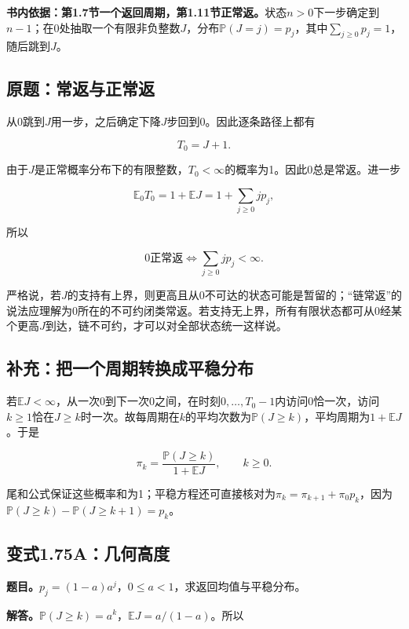 \documentclass[
  11pt,a4paper,UTF8,fontset=fandol]{ctexart}
\begin{document}
\textbf{书内依据：第1.7节一个返回周期，第1.11节正常返。}状态\(n>0\)下一步确定到\(n-1\)；在0处抽取一个有限非负整数\(J\)，分布\(\mathbb P(J=j)=p_j\)，其中\(\sum_{j\ge0}p_j=1\)，随后跳到\(J\)。

\subsection{原题：常返与正常返}\label{ux539fux9898ux5e38ux8fd4ux4e0eux6b63ux5e38ux8fd4}

从0跳到\(J\)用一步，之后确定下降\(J\)步回到0。因此逐条路径上都有

\[\boxed{T_0=J+1.}\]

由于\(J\)是正常概率分布下的有限整数，\(T_0<\infty\)的概率为1。因此0总是常返。进一步

\[\mathbb E_0T_0=1+\mathbb EJ=1+\sum_{j\ge0}jp_j,\]

所以

\[\boxed{0\text{正常返}\iff\sum_{j\ge0}jp_j<\infty.}\]

严格说，若\(J\)的支持有上界，则更高且从0不可达的状态可能是暂留的；``链常返''的说法应理解为0所在的不可约闭类常返。若支持无上界，所有有限状态都可从0经某个更高\(J\)到达，链不可约，才可以对全部状态统一这样说。

\subsection{补充：把一个周期转换成平稳分布}\label{ux8865ux5145ux628aux4e00ux4e2aux5468ux671fux8f6cux6362ux6210ux5e73ux7a33ux5206ux5e03}

若\(\mathbb EJ<\infty\)，从一次0到下一次0之间，在时刻\(0,\ldots,T_0-1\)内访问0恰一次，访问\(k\ge1\)恰在\(J\ge k\)时一次。故每周期在\(k\)的平均次数为\(\mathbb P(J\ge k)\)，平均周期为\(1+\mathbb EJ\)。于是

\[\boxed{\pi_k=\frac{\mathbb P(J\ge k)}{1+\mathbb EJ},\qquad k\ge0.}\]

尾和公式保证这些概率和为1；平稳方程还可直接核对为\(\pi_k=\pi_{k+1}+\pi_0p_k\)，因为\(\mathbb P(J\ge k)-\mathbb P(J\ge k+1)=p_k\)。

\subsection{变式1.75A：几何高度}\label{ux53d8ux5f0f1.75aux51e0ux4f55ux9ad8ux5ea6}

\textbf{题目。}\(p_j=(1-a)a^j\)，\(0\le a<1\)，求返回均值与平稳分布。

\textbf{解答。}\(\mathbb P(J\ge k)=a^k\)，\(\mathbb EJ=a/(1-a)\)。所以
\end{document}
